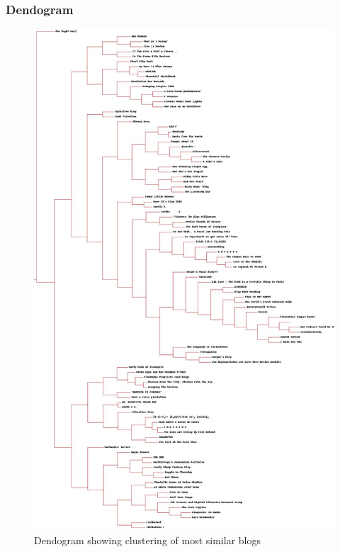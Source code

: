 \subsubsection{Dendogram}
\begin{figure}[ht]    
    \begin{center}
        \includegraphics[scale=0.23]{clusterblogtfidf.jpg}
        \caption{Dendogram showing clustering of most similar blogs}
        \label{graph51}
    \end{center}
\end{figure}
\newpage
